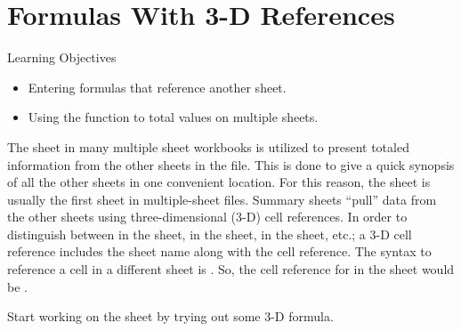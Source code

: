 \section{Formulas With 3-D References}

\begin{center}
	\begin{objbox}{Learning Objectives}
		\begin{itemize}
			\setlength{\itemsep}{0pt}
			\setlength{\parskip}{0pt}
			\setlength{\parsep}{0pt}

			\item Entering formulas that reference another sheet.
			\item Using the  function to total values on multiple sheets.
			
		\end{itemize}
	\end{objbox}
\end{center}

The  sheet in many multiple sheet workbooks is utilized to present totaled information from the other sheets in the file. This is done to give a quick synopsis of all the other sheets in one convenient location. For this reason, the  sheet is usually the first sheet in multiple-sheet files. Summary sheets ``pull'' data from the other sheets using three-dimensional (3-D) cell references. In order to distinguish between  in the  sheet,  in the  sheet,  in the  sheet, etc.; a 3-D cell reference includes the sheet name along with the cell reference. The syntax to reference a cell in a different sheet is . So, the cell reference for  in the  sheet would be .

Start working on the  sheet by trying out some 3-D formula.

